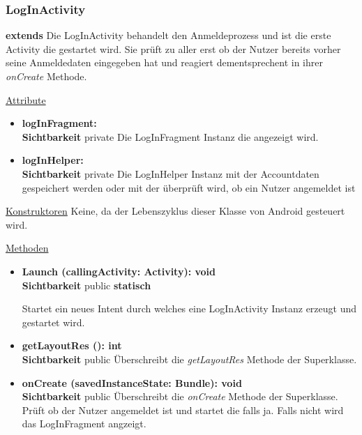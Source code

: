 \subsubsection{LogInActivity} \label{app:klasse:LogInActivity}
\textbf{extends} \newline
Die LogInActivity behandelt den Anmeldeprozess und ist die erste Activity die gestartet wird. Sie prüft zu aller erst ob der Nutzer bereits vorher seine Anmeldedaten eingegeben hat und reagiert dementsprechent in ihrer \textit{onCreate} Methode.
\newline

\underline{Attribute}
\begin{itemize}
\itemsep0pt
\item \textbf{logInFragment: } \hfill\\ 
\textbf{Sichtbarkeit} private\newline
Die LogInFragment Instanz die angezeigt wird.

\item \textbf{logInHelper: } \hfill\\ 
\textbf{Sichtbarkeit} private\newline
Die LogInHelper Instanz mit der Accountdaten gespeichert werden oder mit der überprüft wird, ob ein Nutzer angemeldet ist

\end{itemize}

\underline{Konstruktoren}\newline
\indent Keine, da der Lebenszyklus dieser Klasse von Android gesteuert wird.\newline

\underline{Methoden}
\begin{itemize}
\itemsep0pt

\item \textbf{Launch (callingActivity: Activity): void}\hfill\\
\textbf{Sichtbarkeit} public \newline
\textbf{statisch} 

Startet ein neues Intent durch welches eine LogInActivity Instanz erzeugt und gestartet wird.

\item \textbf{getLayoutRes (): int}\hfill\\
\textbf{Sichtbarkeit} public\newline
Überschreibt die \textit{getLayoutRes} Methode der Superklasse.

\item \textbf{onCreate (savedInstanceState: Bundle): void}\hfill\\
\textbf{Sichtbarkeit} public\newline
Überschreibt die \textit{onCreate} Methode der Superklasse. Prüft ob der Nutzer angemeldet ist und startet die  falls ja. Falls nicht wird das LogInFragment angzeigt.

\end{itemize}